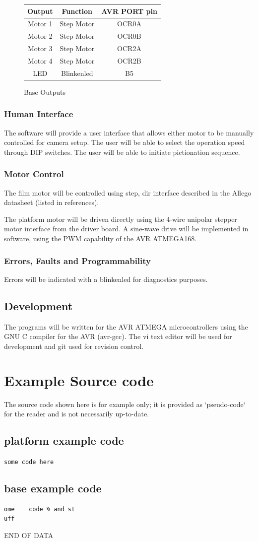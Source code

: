 \documentclass[dvips,12pt]{article}
\begin{document}
\renewcommand{\arraystretch}{1.4}%
\begin{figure}[htb]
\centering
\begin{tabular}{|c|c|c|}
\hline
Output&Function&AVR PORT pin\\
\hline
Motor 1&Step Motor&OCR0A\\
\hline
Motor 2&Step Motor&OCR0B\\
\hline
Motor 3&Step Motor&OCR2A\\
\hline
Motor 4&Step Motor&OCR2B\\
\hline
LED&Blinkenled&B5\\
\hline
\end{tabular}
\caption{Base Outputs}
\label{fig:baseoutputs}
\end{figure}

\subsubsection{Human Interface}
The software will provide a user interface that allows either motor to be manually controlled for camera setup. The user will be able to select the operation speed through DIP switches. The user will be able to initiate pictionation sequence. 
\subsubsection{Motor Control}
The film motor will be controlled using step, dir interface described in the Allego datasheet (listed in references).

The platform motor will be driven directly using the 4-wire unipolar stepper motor interface from the driver board. A sine-wave drive will be implemented in software, using the PWM capability of the AVR ATMEGA168.
\subsubsection{Errors, Faults and Programmability}
Errors will be indicated with a blinkenled for diagnostics purposes.
\subsection{Development}
The programs will be written for the AVR ATMEGA microcontrollers using the GNU C compiler for the AVR (avr-gcc). The vi text editor will be used for development and git used for revision control. 


\section{Example Source code}
The source code shown here is for example only; it is provided as `pseudo-code` for the reader and is not necessarily up-to-date.
\subsection{platform example code}
\texttt{some code here}
\subsection{base example code}
\begin{verbatim}
ome    code % and st
uff
\end{verbatim}
\centering

\vspace{2cm}

END OF DATA
\appendix
\end{document}
